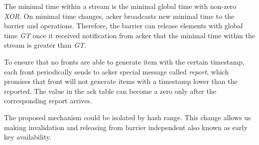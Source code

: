 The minimal time within a stream is the minimal global time with non-zero {\it XOR}. On minimal time changes, acker broadcasts new minimal time to the barrier and operations. Therefore, the barrier can release elements with global time {\it GT} once it received notification from acker that the minimal time within the stream is greater than {\it GT}.

To ensure that no fronts are able to generate item with the certain timestamp, each front periodically sends to acker special message called {\it report}, which promises that front will not generate items with a timestamp lower than the reported. The value in the ack table can become a zero only after the corresponding report arrives.

The proposed mechanism could be isolated by hash range. This change allows us making invalidation and releasing from barrier independent also known as early key availability.
